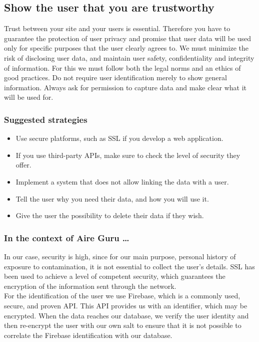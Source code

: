 \subsection{Show the user that you are trustworthy}

Trust between your site and your users is essential.
Therefore you have to guarantee the protection of user privacy and promise that user data will be used only for specific purposes that the user clearly agrees to.
We must minimize the risk of disclosing user data, and maintain user safety, confidentiality and integrity of information.
For this we must follow both the legal norms and an ethics of good practices.
Do not require user identification merely to show general information.
Always ask for permission to capture data and make clear what it will be used for.

\subsubsection*{Suggested strategies} 

\begin{itemize}
    \item Use secure platforms, such as SSL if you develop a web application.
    \item If you use third-party APIs, make sure to check the level of security they offer.
    \item Implement a system that does not allow linking the data with a user.
    \item Tell the user why you need their data, and how you will use it.
    \item Give the user the possibility to delete their data if they wish.
\end{itemize}

\subsubsection*{In the context of Aire Guru \ldots} 

In our case, security is high, since for our main purpose, personal history
of exposure to contamination, it is not essential to collect the user's details.
SSL has been used to achieve a level of competent security, which guarantees the encryption of
the information sent through the network.\\

For the identification of the user we use Firebase, which is a commonly used, secure, and proven API.
This API provides us with an identifier, which may be encrypted.
When the data reaches our database, we verify the user identity and then re-encrypt the user with our own salt to
ensure that it is not possible to correlate the Firebase identification with our database. \\

